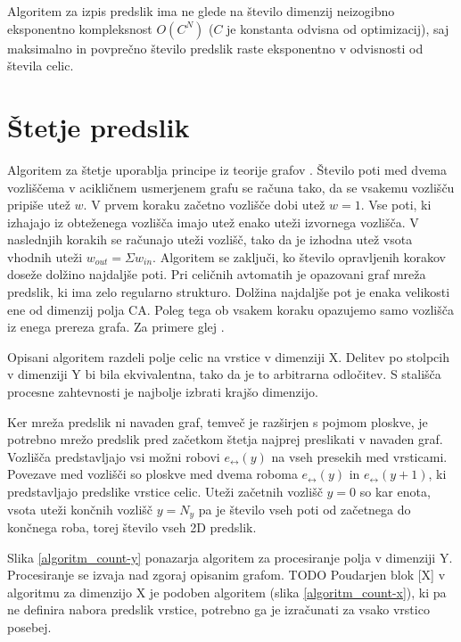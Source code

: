 \documentclass[12pt,a4paper,openany,twoside]{book}
\begin{document}
Algoritem za izpis predslik ima ne glede na število dimenzij
neizogibno eksponentno kompleksnost \(O(C^N)\) (\(C\) je konstanta odvisna od optimizacij),
saj maksimalno in povprečno število predslik raste eksponentno
v odvisnosti od števila celic.

\section{Štetje predslik}

Algoritem za štetje uporablja principe iz teorije grafov \cite{DBLP:journals/corr/cs-DL-0309023}.
Število poti med dvema vozliščema v acikličnem usmerjenem grafu se računa tako,
da se vsakemu vozlišču pripiše utež \(w\).
V prvem koraku začetno vozlišče dobi utež \(w=1\).
Vse poti, ki izhajajo iz obteženega vozlišča
imajo utež enako uteži izvornega vozlišča.
V naslednjih korakih se računajo uteži vozlišč,
tako da je izhodna utež vsota vhodnih uteži \(w_{out}=\Sigma w_{in}\).
Algoritem se zaključi, ko število opravljenih korakov doseže dolžino najdaljše poti.
Pri celičnih avtomatih je opazovani graf mreža predslik, ki ima zelo regularno strukturo.
Dolžina najdaljše pot je enaka velikosti ene od dimenzij polja CA.
Poleg tega ob vsakem koraku opazujemo samo vozlišča iz enega prereza grafa.
Za primere glej \cite{JerasDobnikar2007}.

Opisani algoritem razdeli polje celic na vrstice v dimenziji X.
Delitev po stolpcih v dimenziji Y bi bila ekvivalentna, tako da je to arbitrarna odločitev.
S stališča procesne zahtevnosti je najbolje izbrati krajšo dimenzijo.

Ker mreža predslik ni navaden graf, temveč je razširjen s pojmom ploskve,
je potrebno mrežo predslik pred začetkom štetja najprej preslikati v navaden graf.
Vozlišča predstavljajo vsi možni robovi \(e_{\leftrightarrow}(y)\) na vseh presekih med vrsticami.
Povezave med vozlišči so ploskve med dvema roboma
\(e_{\leftrightarrow}(y)\) in \(e_{\leftrightarrow}(y+1)\),
ki predstavljajo predslike vrstice celic.
Uteži začetnih vozlišč \(y=0\) so kar enota,
vsota uteži končnih vozlišč \(y=N_y\) pa je število vseh poti od začetnega do končnega roba,
torej število vseh 2D predslik.

Slika \ref{algoritm_count-y} ponazarja algoritem za procesiranje polja v dimenziji Y.
Procesiranje se izvaja nad zgoraj opisanim grafom. TODO
Poudarjen blok [X] v algoritmu za dimenzijo X je podoben algoritem (slika \ref{algoritm_count-x}), ki pa 
ne definira nabora predslik vrstice,
potrebno ga je izračunati za vsako vrstico posebej.
\end{document}
